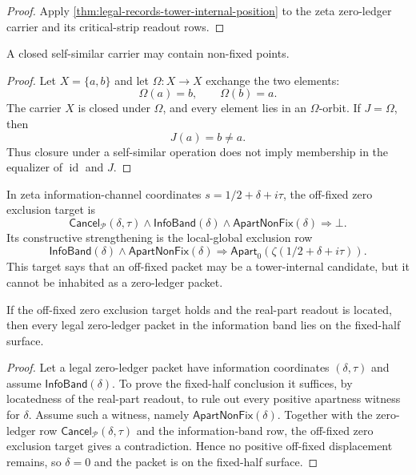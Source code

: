 \begin{proof}
Apply \autoref{thm:legal-records-tower-internal-position} to the zeta
zero-ledger carrier and its critical-strip readout rows.
\end{proof}

\begin{proposition}
\label{prop:closure-does-not-imply-fixedness}
A closed self-similar carrier may contain non-fixed points.
\end{proposition}

\begin{proof}
Let $X=\{a,b\}$ and let $\Omega:X\to X$ exchange the two elements:
$$
\Omega(a)=b,
\qquad
\Omega(b)=a.
$$
The carrier $X$ is closed under $\Omega$, and every element lies in an
$\Omega$-orbit. If $J=\Omega$, then
$$
J(a)=b\neq a.
$$
Thus closure under a self-similar operation does not imply membership in
the equalizer of $\operatorname{id}$ and $J$.
\end{proof}

\begin{definition}
\label{def:off-fixed-zero-exclusion-target}
In zeta information-channel coordinates
$s=1/2+\delta+i\tau$, the off-fixed zero exclusion target is
$$
\mathsf{Cancel}_{\mathcal P}(\delta,\tau)
\wedge
\mathsf{InfoBand}(\delta)
\wedge
\mathsf{ApartNonFix}(\delta)
\Longrightarrow
\bot.
$$
Its constructive strengthening is the local-global exclusion row
$$
\mathsf{InfoBand}(\delta)
\wedge
\mathsf{ApartNonFix}(\delta)
\Longrightarrow
\mathsf{Apart}_0(\zeta(1/2+\delta+i\tau)).
$$
This target says that an off-fixed packet may be a tower-internal
candidate, but it cannot be inhabited as a zero-ledger packet.
\end{definition}

\begin{theorem}
\label{thm:off-fixed-exclusion-gives-fixed-half-zero-ledger}
If the off-fixed zero exclusion target holds and the real-part readout is
located, then every legal zero-ledger packet in the information band lies
on the fixed-half surface.
\end{theorem}

\begin{proof}
Let a legal zero-ledger packet have information coordinates
$(\delta,\tau)$ and assume $\mathsf{InfoBand}(\delta)$. To prove the
fixed-half conclusion it suffices, by locatedness of the real-part
readout, to rule out every positive apartness witness for $\delta$.
Assume such a witness, namely $\mathsf{ApartNonFix}(\delta)$. Together
with the zero-ledger row
$\mathsf{Cancel}_{\mathcal P}(\delta,\tau)$ and the information-band row,
the off-fixed zero exclusion target gives a contradiction. Hence no
positive off-fixed displacement remains, so $\delta=0$ and the packet is
on the fixed-half surface.
\end{proof}

